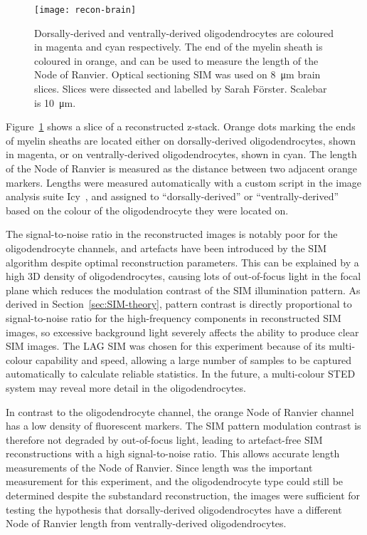 \begin{figure}[tbp!]
\centering
\texttt{[image: recon-brain]}
\caption[LAG SIM: Multicolour optical sectioning SIM to measure the Node of Ranvier on ventrally- and dorsally-derived oligodendrocytes]{Dorsally-derived and ventrally-derived oligodendrocytes are coloured in magenta and cyan respectively. The end of the myelin sheath is coloured in orange, and can be used to measure the length of the Node of Ranvier. Optical sectioning SIM was used on \SI{8}{\micro\metre} brain slices. Slices were dissected and labelled by Sarah F{\"o}rster. Scalebar is \SI{10}{\micro\metre}. }
\label{fig:recon-brain}
\end{figure}
\afterpage{\clearpage}

Figure~\ref{fig:recon-brain} shows a slice of a reconstructed z-stack.
Orange dots marking the ends of myelin sheaths are located either on dorsally-derived oligodendrocytes, shown in magenta, or on ventrally-derived oligodendrocytes, shown in cyan.
The length of the Node of Ranvier is measured as the distance between two adjacent orange markers.
Lengths were measured automatically with a custom script in the image analysis suite Icy~\cite{de2012icy}, and assigned to ``dorsally-derived'' or ``ventrally-derived'' based on the colour of the oligodendrocyte they were located on.

The signal-to-noise ratio in the reconstructed images is notably poor for the oligodendrocyte channels, and artefacts have been introduced by the SIM algorithm despite optimal reconstruction parameters.
This can be explained by a high 3D density of oligodendrocytes, causing lots of out-of-focus light in the focal plane which reduces the modulation contrast of the SIM illumination pattern.
As derived in Section~\ref{sec:SIM-theory}, pattern contrast is directly proportional to signal-to-noise ratio for the high-frequency components in reconstructed SIM images, so excessive background light severely affects the ability to produce clear SIM images.
The LAG SIM was chosen for this experiment because of its multi-colour capability and speed, allowing a large number of samples to be captured automatically to calculate reliable statistics. 
In the future, a multi-colour STED system may reveal more detail in the oligodendrocytes. 

In contrast to the oligodendrocyte channel, the orange Node of Ranvier channel has a low density of fluorescent markers.
The SIM pattern modulation contrast is therefore not degraded by out-of-focus light, leading to artefact-free SIM reconstructions with a high signal-to-noise ratio.
This allows accurate length measurements of the Node of Ranvier.
Since length was the important measurement for this experiment, and the oligodendrocyte type could still be determined despite the substandard reconstruction, the images were sufficient for testing the hypothesis that dorsally-derived oligodendrocytes have a different Node of Ranvier length from ventrally-derived oligodendrocytes.

